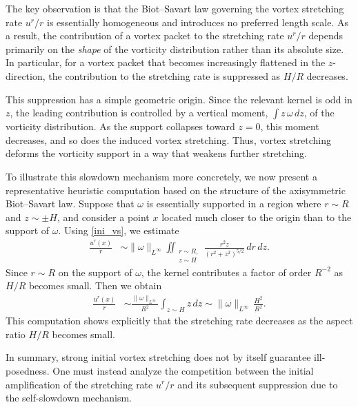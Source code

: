 \documentclass[reqno,11pt]{amsart}
\begin{document}
The key observation is that the Biot--Savart law governing the vortex
stretching rate $u^r/r$ is essentially homogeneous and introduces no preferred
length scale. As a result, the contribution of a vortex packet to the
stretching rate $u^r/r$ depends primarily on the \emph{shape} of the vorticity
distribution rather than its absolute size. In particular, for a vortex
packet that becomes increasingly flattened in the $z$-direction, the
contribution to the stretching rate is suppressed as $H/R$ decreases.

This suppression has a simple geometric origin. Since the relevant kernel is
odd in $z$, the leading contribution is controlled by a vertical moment, $\int z\, \omega \, dz$, of
the vorticity distribution. As the support collapses toward $z=0$, this
moment decreases, and so does the induced vortex stretching. Thus, vortex
stretching deforms the vorticity support in a way that weakens further
stretching.

To illustrate this slowdown mechanism more concretely, we now present a
representative heuristic computation based on the structure of the
axisymmetric Biot--Savart law. Suppose that $\omega$ is essentially supported
in a region where $r\sim R$ and $z\sim \pm H$, and consider a point $x$ located
much closer to the origin than to the support of $\omega$. Using \eqref{ini_vs}, we estimate
\begin{align*}
    \frac{u^r(x)}{r}
    &\sim
    \|\omega\|_{L^\infty}
    \iint_{ \substack{r\sim R,\\ z\sim H}}
    \frac{r^2 z}{(r^2+z^2)^{5/2}} \, dr\,dz.
\end{align*}
Since $r\sim R$ on the support of $\omega$, the kernel contributes a factor of
order $R^{-2}$ as $H/R $ becomes small. 
Then we obtain
\begin{align*}
    \frac{u^r(x)}{r}
    &\sim
    \frac{\|\omega\|_{L^\infty}}{R^2}
    \int_{z\sim H} z \, dz
    \sim
    \|\omega\|_{L^\infty}\,\frac{H^2}{R^2}.
\end{align*}
This computation shows explicitly that the stretching rate decreases as the
aspect ratio $H/R$ becomes small. 

In summary, strong initial vortex stretching does not by itself guarantee
ill-posedness. One must instead analyze the competition between the initial
amplification of the stretching rate $u^r/r$ and its subsequent suppression due to
the self-slowdown mechanism. 
\end{document}
